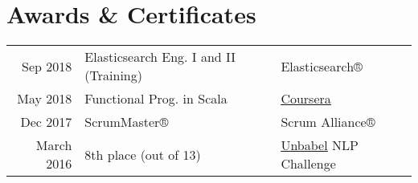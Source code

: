 \documentclass[letterpaper]{deedy-resume} %
\begin{document}
\begin{minipage}[t]{0.64\textwidth}




\section{Awards \& Certificates} 
\begin{tabular}{rll}
Sep 2018   & Elasticsearch Eng. I and II (Training)              & Elasticsearch® \\
May 2018         & Functional Prog. in Scala              & \href{https://www.coursera.org/account/accomplishments/verify/N4KVKVTZBQD2}{\underline{Coursera}}          \\
Dec 2017         & ScrumMaster®                                 & Scrum Alliance®   \\             
March 2016		 & 8th place (out of 13)                        & \href{https://unbabel.com/}{\underline{Unbabel}} NLP Challenge \\
\end{tabular}


\end{minipage} %








\end{document}
